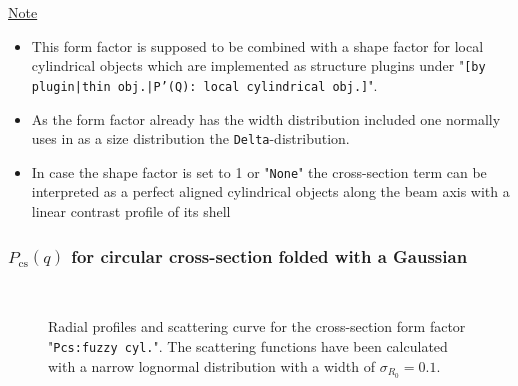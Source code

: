 \noindent
\uline{Note}
\begin{itemize}
  \item This form factor is supposed to be combined with a shape factor for
local cylindrical objects which are implemented as structure  plugins
under "\texttt{[by plugin|thin obj.|P'(Q): local cylindrical obj.]}".
\item As the form factor already has the width distribution included one normally uses in \SASfit as a size distribution
the \texttt{Delta}-distribution.
\item In case the shape factor is set to 1 or "\texttt{None}" the cross-section term can be interpreted as a perfect aligned cylindrical objects along the beam axis with a linear contrast profile of its shell
\end{itemize}
\clearpage
\subsubsection{$P_\mathrm{cs}(q)$ for circular cross-section folded with a Gaussian } ~\\
\label{plugin:Pcs:cyl_fuzzy}
\begin{figure}[htb]
\captionsetup[subfigure]{position=b}
\centering
{}
\hfill
{}
\caption{Radial profiles and scattering curve for the cross-section form factor "\texttt{Pcs:fuzzy cyl.}". The scattering functions have been calculated with a narrow lognormal distribution with a width of $\sigma_{R_0}=0.1$.}
\label{fig:Pcs:cyl_fuzzy}
\end{figure}


